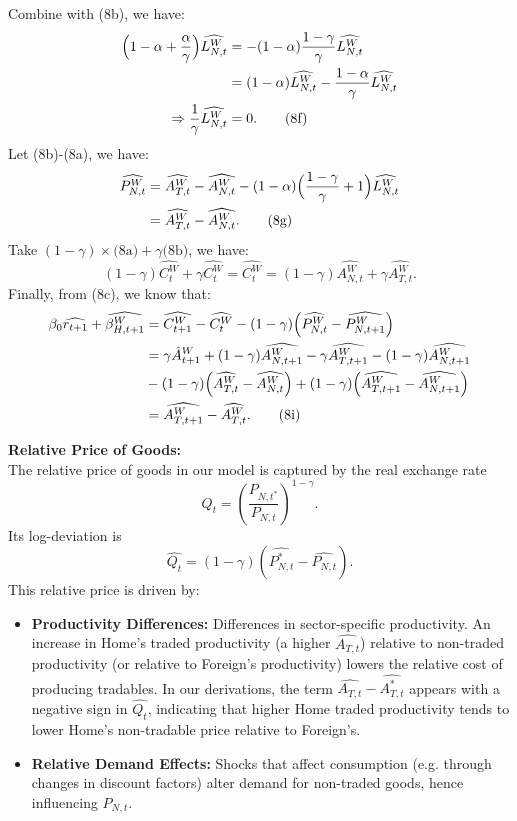\documentclass[a4paper,12pt]{article} %
\theoremstyle{nonitalic}
\begin{document}
Combine with (8b), we have:
\begin{align*}
    \Bigl(1 - \alpha + \frac{\alpha}{\gamma} \Bigr)  \widehat{L_{N,t}^W} &= -(1-\alpha) \frac{1-\gamma}{\gamma}  \widehat{L_{N,t}^W} \\
    &= (1-\alpha)  \widehat{L_{N,t}^W} - \frac{1-\alpha}{\gamma}  \widehat{L_{N,t}^W} \\
    \Rightarrow \frac{1}{\gamma}  \widehat{L_{N,t}^W} &= 0. \tag{8f}
\end{align*}
Let (8b)-(8a), we have:
\begin{align*}
     \widehat{P_{N,t}^W} &=  \widehat{A_{T,t}^W} -  \widehat{A_{N,t}^W} - (1-\alpha)\Bigl(\frac{1-\gamma}{\gamma} + 1\Bigr)  \widehat{L_{N,t}^W} \\
    &=  \widehat{A_{T,t}^W} -  \widehat{A_{N,t}^W}. \tag{8g}
\end{align*}
Take $(1-\gamma) \times \text{(8a)} + \gamma \text{(8b)}$, we have:
\[
(1-\gamma)  \widehat{C_t^W} + \gamma  \widehat{C_t^W} =  \widehat{C_t^W} = (1-\gamma)  \widehat{A_{N,t}^W} + \gamma  \widehat{A_{T,t}^W}. \tag{8h}
\]
Finally, from (8c), we know that:
\begin{align*}
    \beta_0  \widehat{r_{t+1}} + \widehat{\beta_{H, t+1}^W} &=  \widehat{C_{t+1}^W} -  \widehat{C_t^W} - (1-\gamma)\Bigl( \widehat{P_{N,t}^W} - \widehat{P_{N, t+1}^W}\Bigr) \\
    &= \gamma \hat{A}_{t+1}^W + (1-\gamma)  \widehat{A_{N,t+1}^W} - \gamma  \widehat{A_{T,t+1}^W} - (1-\gamma)  \widehat{A_{N,t+1}^W} \\
    \quad \quad &- (1-\gamma)\Bigl( \widehat{A_{T,t}^W} -  \widehat{A_{N,t}^W}\Bigr) + (1-\gamma) \Bigl( \widehat{A_{T,t+1}^W} - \widehat{A_{N, t+1}^W} \Bigr) \\
    &= \widehat{A_{T, t+1}^W} -  \widehat{A_{T,t}^W}. \tag{8i}
\end{align*}

\textbf{Relative Price of Goods:}\\
The relative price of goods in our model is captured by the real exchange rate
\[
Q_t = \left(\frac{P_{N,t^*}}{P_{N,t}}\right)^{1-\gamma}.
\]
Its log-deviation is
\[
\widehat{Q_t} = (1-\gamma)(\widehat{P_{N,t}^*}-\widehat{P_{N,t}}).
\]
This relative price is driven by:
\begin{itemize}
    \item \textbf{Productivity Differences:} Differences in sector-specific productivity. An increase in Home's traded productivity (a higher \( \widehat{A_{T,t}} \)) relative to non-traded productivity (or relative to Foreign's productivity) lowers the relative cost of producing tradables. In our derivations, the term \( \widehat{A_{T,t}} - \widehat{A_{T,t}^*} \) appears with a negative sign in \( \widehat{Q_t} \), indicating that higher Home traded productivity tends to lower Home's non-tradable price relative to Foreign's.
    \item \textbf{Relative Demand Effects:} Shocks that affect consumption (e.g. through changes in discount factors) alter demand for non-traded goods, hence influencing \( P_{N,t} \).
\end{itemize}
\end{document}
